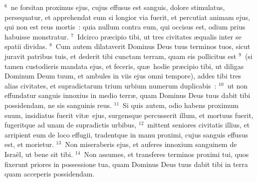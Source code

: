 ${}^{6}$~ne forsitan proximus ejus, cujus effusus est sanguis, dolore stimulatus, persequatur, et apprehendat eum si longior via fuerit, et percutiat animam ejus, qui non est reus mortis~: quia nullum contra eum, qui occisus est, odium prius habuisse monstratur.
${}^{7}$~Idcirco pr\ae cipio tibi, ut tres civitates \ae qualis inter se spatii dividas.
${}^{8}$~Cum autem dilataverit Dominus Deus tuus terminos tuos, sicut juravit patribus tuis, et dederit tibi cunctam terram, quam eis pollicitus est
${}^{9}$~(si tamen custodieris mandata ejus, et feceris, qu\ae\ hodie pr\ae cipio tibi, ut diligas Dominum Deum tuum, et ambules in viis ejus omni tempore), addes tibi tres alias civitates, et supradictarum trium urbium numerum duplicabis~:
${}^{10}$~ut non effundatur sanguis innoxius in medio terr\ae , quam Dominus Deus tuus dabit tibi possidendam, ne sis sanguinis reus.
${}^{11}$~Si quis autem, odio habens proximum suum, insidiatus fuerit vit\ae\ ejus, surgensque percusserit illum, et mortuus fuerit, fugeritque ad unam de supradictis urbibus,
${}^{12}$~mittent seniores civitatis illius, et arripient eum de loco effugii, tradentque in manu proximi, cujus sanguis effusus est, et morietur.
${}^{13}$~Non miseraberis ejus, et auferes innoxium sanguinem de Isra\"el, ut bene sit tibi.
${}^{14}$~Non assumes, et transferes terminos proximi tui, quos fixerunt priores in possessione tua, quam Dominus Deus tuus dabit tibi in terra quam acceperis possidendam.


